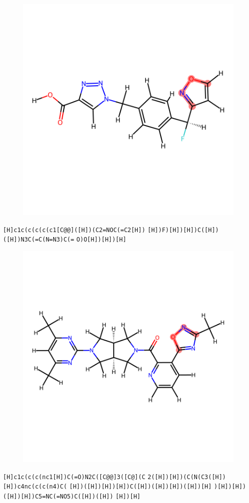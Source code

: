 \documentclass{article}
\begin{document}
\begin{figure}[ht]
\centering
    \includegraphics{mol216.png}
\end{figure}
\verb|[H]c1c(c(c(c(c1[C@@]([H])(C2=NOC(=C2[H])| \verb|[H])F)[H])[H])C([H])([H])N3C(=C(N=N3)C(=| \verb|O)O[H])[H])[H]|

\begin{figure}[ht]
\centering
    \includegraphics{mol217.png}
\end{figure}
\verb|[H]c1c(c(c(nc1[H])C(=O)N2C([C@@]3([C@](C| \verb|2([H])[H])(C(N(C3([H])[H])c4nc(c(c(n4)C(| \verb|[H])([H])[H])[H])C([H])([H])[H])([H])[H]| \verb|)[H])[H])([H])[H])C5=NC(=NO5)C([H])([H])| \verb|[H])[H]|
\end{document}
